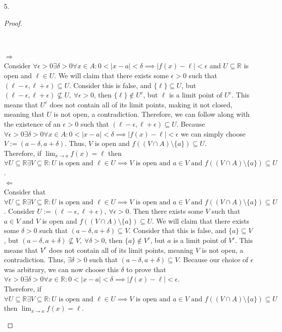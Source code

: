 \documentclass[11pt]{article}
\newcommand{\R}{\mathbb{R}}
\newenvironment{myproof}
{\begin{proof} \begin{adjustwidth}{3em}{0pt}$ $\par\nobreak\ignorespaces}
{\end{adjustwidth} \end{proof}}
\begin{document}
\begin{flushleft}
5.
\begin{myproof}
$\Rightarrow$ \\
Consider $\forall \epsilon > 0 \exists \delta > 0 \forall x \in A: 0 < |x-a| < \delta \implies |f(x) - \ell | < \epsilon$ and $U \subseteq \R$ is open and $\ell \in U$. We will claim that there exists some $\epsilon > 0$ such that $(\ell - \epsilon, \ell + \epsilon) \subseteq U$. Consider this is false, and $\{ \ell \} \subseteq U$, but $(\ell - \epsilon, \ell + \epsilon) \not\subseteq U, \ \forall \epsilon > 0$, then $\{ \ell \} \notin U^c$, but $\ell$ is a limit point of $U^c$. This means that $U^c$ does not contain all of its limit points, making it not closed, meaning that $U$ is not open, a contradiction. Therefore, we can follow along with the existence of an $\epsilon >0$ such that $(\ell - \epsilon, \ell + \epsilon) \subseteq U$. Because $\forall \epsilon > 0 \exists \delta > 0 \forall x \in A: 0 < |x-a| < \delta \implies |f(x) - \ell | < \epsilon$ we can simply choose $V := (a - \delta, a + \delta)$. Thus, $V$ is open and $f((V \cap A) \setminus \{ a \} )  \subseteq U$. \\
\bigskip
Therefore, if $\lim_{x\to a}f(x) = \ell$ then $\forall U \subseteq \R \exists V \subseteq \R: U \text{ is open and } \ell \in U \implies V \text{ is open and } a \in V \text{ and } f((V \cap A) \setminus \{ a \}) \subseteq U$. \\
\bigskip
$\Leftarrow$ \\
Consider that $\forall U \subseteq \R \exists V \subseteq \R: U \text{ is open and } \ell \in U \implies V \text{ is open and } a \in V \text{ and } f((V \cap A) \setminus \{ a \}) \subseteq U$.
Consider $U := (\ell - \epsilon, \ell + \epsilon), \ \forall \epsilon > 0$. Then there exists some $V$ such that $a \in V$ and $V$ is open and $f((V \cap A) \setminus \{ a \}) \subseteq U$. We will claim that there exists some $\delta > 0$ such that $(a - \delta, a + \delta) \subseteq V$. Consider that this is false, and $\{ a \} \subseteq V$, but $(a - \delta, a + \delta) \not\subseteq V, \ \forall \delta > 0$, then $\{ a \} \notin V^c$, but $a$ is a limit point of $V^c$. This means that $V^c$ does not contain all of its limit points, meaning $V$ is not open, a contradiction. Thus, $\exists \delta > 0$ such that $(a - \delta, a + \delta) \subseteq V$. Because our choice of $\epsilon$ was arbitrary, we can now choose this $\delta$ to prove that $\forall \epsilon > 0 \exists \delta > 0 \forall x \in \R: 0 < |x-a| < \delta \implies |f(x)-\ell| < \epsilon$. \\
\bigskip
Therefore, if $\forall U \subseteq \R \exists V \subseteq \R: U \text{ is open and } \ell \in U \implies V \text{ is open and } a \in V \text{ and } f((V \cap A) \setminus \{ a \}) \subseteq U$ then $\lim_{x\to a}f(x) = \ell$.
\end{myproof}
\end{flushleft}
\end{document}
